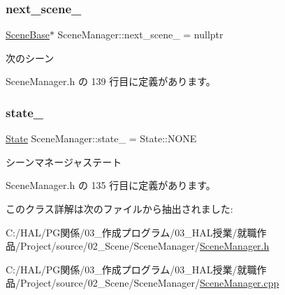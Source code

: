\subsubsection{\texorpdfstring{next\+\_\+scene\+\_\+}{next\_scene\_}}
{\footnotesize\ttfamily \mbox{\hyperlink{class_scene_base}{Scene\+Base}}$\ast$ Scene\+Manager\+::next\+\_\+scene\+\_\+ = nullptr\hspace{0.3cm}{\ttfamily [private]}}



次のシーン 



 Scene\+Manager.\+h の 139 行目に定義があります。

\mbox{\label{class_scene_manager_adf81d8a63dee92bfe5bb934903542bec}} 
\subsubsection{\texorpdfstring{state\+\_\+}{state\_}}
{\footnotesize\ttfamily \mbox{\hyperlink{class_scene_manager_a68d32794fe1ce945c6a6c380c11a08eb}{State}} Scene\+Manager\+::state\+\_\+ = State\+::\+N\+O\+NE\hspace{0.3cm}{\ttfamily [private]}}



シーンマネージャステート 



 Scene\+Manager.\+h の 135 行目に定義があります。



このクラス詳解は次のファイルから抽出されました\+:\begin{DoxyCompactItemize}
\item 
C\+:/\+H\+A\+L/\+P\+G関係/03\+\_\+作成プログラム/03\+\_\+\+H\+A\+L授業/就職作品/\+Project/source/02\+\_\+\+Scene/\+Scene\+Manager/\mbox{\hyperlink{_scene_manager_8h}{Scene\+Manager.\+h}}\item 
C\+:/\+H\+A\+L/\+P\+G関係/03\+\_\+作成プログラム/03\+\_\+\+H\+A\+L授業/就職作品/\+Project/source/02\+\_\+\+Scene/\+Scene\+Manager/\mbox{\hyperlink{_scene_manager_8cpp}{Scene\+Manager.\+cpp}}\end{DoxyCompactItemize}
